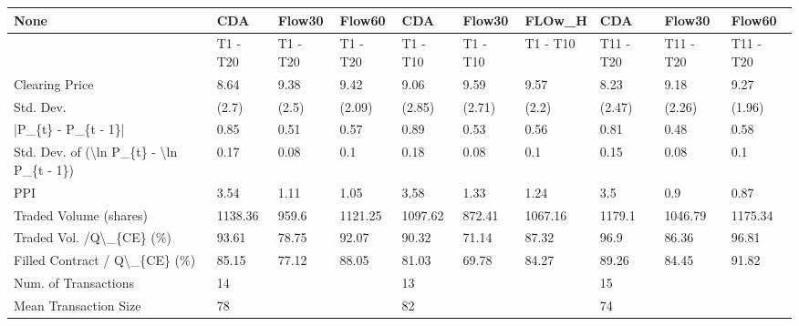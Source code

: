 \begin{tabular}{llllllllll}
\hline
 None                                                      & CDA      & Flow30   & Flow60   & CDA      & Flow30   & FLOw\_H   & CDA       & Flow30    & Flow60    \\
\hline
                                                           & T1 - T20 & T1 - T20 & T1 - T20 & T1 - T10 & T1 - T10 & T1 - T10 & T11 - T20 & T11 - T20 & T11 - T20 \\
 Clearing Price                                            & 8.64     & 9.38     & 9.42     & 9.06     & 9.59     & 9.57     & 8.23      & 9.18      & 9.27      \\
 Std. Dev.                                                 & (2.7)    & (2.5)    & (2.09)   & (2.85)   & (2.71)   & (2.2)    & (2.47)    & (2.26)    & (1.96)    \\
 |P\_\{t\} - P\_\{t - 1\}|                                       & 0.85     & 0.51     & 0.57     & 0.89     & 0.53     & 0.56     & 0.81      & 0.48      & 0.58      \\
 Std. Dev. of (\textbackslash{}ln P\_\{t\} - \textbackslash{}ln P\_\{t - 1\})                  & 0.17     & 0.08     & 0.1      & 0.18     & 0.08     & 0.1      & 0.15      & 0.08      & 0.1       \\
 PPI                                                       & 3.54     & 1.11     & 1.05     & 3.58     & 1.33     & 1.24     & 3.5       & 0.9       & 0.87      \\
 Traded Volume (shares)                                    & 1138.36  & 959.6    & 1121.25  & 1097.62  & 872.41   & 1067.16  & 1179.1    & 1046.79   & 1175.34   \\
 Traded Vol. /Q\textbackslash{}\_\{CE\} (\%)                                  & 93.61    & 78.75    & 92.07    & 90.32    & 71.14    & 87.32    & 96.9      & 86.36     & 96.81     \\
 Filled Contract / Q\textbackslash{}\_\{CE\} (\%)                             & 85.15    & 77.12    & 88.05    & 81.03    & 69.78    & 84.27    & 89.26     & 84.45     & 91.82     \\
 Num. of Transactions                                      & 14       &          &          & 13       &          &          & 15        &           &           \\
 Mean Transaction Size                                     & 78       &          &          & 82       &          &          & 74        &           &           \\

\end{tabular}
